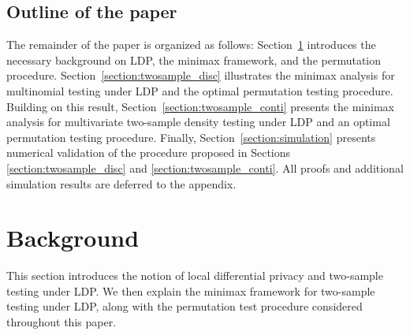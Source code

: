 \documentclass[twoside,11pt]{article}
\begin{document}
\subsection{Outline of the paper}
The remainder of the paper is organized as follows:
Section~\ref{section:background} introduces the necessary background on LDP, the minimax framework, and the permutation procedure.
Section~\ref{section:twosample_disc} illustrates the minimax analysis for multinomial testing under LDP and the optimal permutation testing procedure.
Building on this result, Section~\ref{section:twosample_conti} presents the minimax analysis for multivariate two-sample density testing under LDP and an optimal permutation testing procedure.
Finally, Section~\ref{section:simulation} presents numerical validation of the procedure proposed in Sections \ref{section:twosample_disc} and \ref{section:twosample_conti}. All proofs and additional simulation results are deferred to the appendix.
%
\section{Background}\label{section:background}
This section introduces the notion of local differential privacy and two-sample testing under LDP. We then explain the minimax framework for two-sample testing under LDP, along with the permutation test procedure considered throughout this paper. 
%
\end{document}
